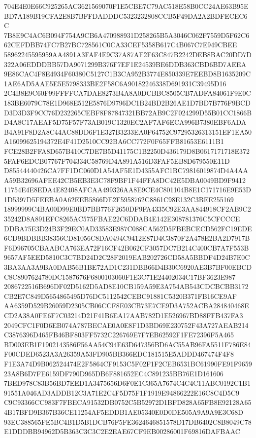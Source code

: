 \documentclass[UTF8,fontset=fandol,zihao=-4,a4paper]{ctexart}
\begin{document}
{{704E4E0E66C925265AC3621569070F1E5CBE7C79AC518E58B0CC24AE63B95EBD7A189B19CFA2E8B7BFFDADDDC5323232808CCB5F49DA2A2BDFECEC6C
7B8E9C4AC6B094F754A9CB6A470988931D258265B5A3046C062F7559D5F62C662CEFDBB74FC7B27BC728561C0CA33CEF5358B617C4B067C7E949CBEE
58962245595959AA4891A3FAF4E9C37A87AF2F63C847B2242DEB8BAC20DD7D322A06EDDDBB57DA9071299B376F7EF1E24539BE6DDB363CBD6BD7AEEA
9E86CAC4F8E4934F60380C5127C1B3CA952B3774E850339E7EEBD8B1635209C1AE6AD5AAE5E5E5798333BE2F58C6A90182246338D691931C39495D16
2C4B8E9C60F99FFFFCA7DAE8273B4A8A0DCBBC8505CB7ADFA84061F9E0C183BE6079C78E1D968E512E5876D9796DC1B24BD2B26AE1D7BD7B776F9BCD
D3D3D3F9CC76D232265CEBF8F87847321BB72AB9C2F024299D55B01CC1866BD4A8C17AEAF5D75F57F73AB019C1320EC2AF7AF6ECA996B7380EBF6ADA
B4A91F8D2A8C44AC88DD6F1E327B3233EA0F64752C97295326313151EF1EA50A16099625194372E4F41D2510CC92BA6CC772F0F65FFB81653E6111B1
FCE28B2FFA8D657B410C7DE7B5D41175C1B2250D436179D8B0617171718E3725FAF6EDCB07767F704334C58769D4A891A516D3FAF5EB8D679550E11D
D85544440426CA7FF1DC060D1A54AF5E1D4355AFC1BC79816019874D4A4AAA59B32696AFEE42CB5EB3E3C78F9BF1F44FFA8DC42E5DBA0049BD9F9412
11754E4E8EDA4E82408AFCAA499326AA8E9CE4C801104B8E1C171716E9E53D1D5397D5FEEBA0A62EEB5866DE2F5958762C8861C98E132C3BEE255169
18999999C4BA00D99E0BD7BB776F2650DF9FA4335C92E3AA844918CF2AB9C235242D8A891EFC8265AC575FBAE22C6DDAB4E142E308781376C5CFCCCE
DDBA75E3D24B3F29EC0AD33583E987C088CA562D5FBEBCECD562FC19EDE6CD9BDBBB38356CD81056C8DA0494C9412E87D4C3870F2A478E2BA2D7917B
F6D96705CBAABCA763EA72F16CF42B062CF3057DC7B214C400CB7A7F553B9657AF5EED5810C3C7BD24D2C28F2019EAB202726CD58A5BBDF4D24B7E0C
3BA3AA3A9BA0DAB56B1BE72AD1C231DBB66D4B30C6920AE3B7BF00EBCDC8C8907624780DC1587676F6800103060F1E3C71E24402034C17BF3623E987
2086722516B696DF02D5162D5AD8E10CB159A59E3A754AB543CDCBCBB3172CB2E7C849D5654865495D76DC5112542CEBC91881C5320B371FB16CE9AF
AA6359D529B26059D2305CB06CCF8E03CB73E7CE9D3A752ACBA284840468ECD2A38A0FE6F7C03214D21F41B6EA17AAB782D1E526967BD88FFB437FA3
2049CFC1F0D6EB074A787BECAE0A0E8F1D3BD69E230752F43A727AEAB214C3876396D465FB46BF803FF5732C226769E7F7EB62592F1FE72396F5A465
BD003EB1F1902143586F56AA54C94E63D647356BD6AC55AB96FA5511F786E84F00CDED6523A3A26359A53FD905BB366EDC181515E5ADDD467474F4F8
F1E3A74D9B062524474E2F5864CF9153C5F02F1F2CEB6531BC61990FE91F965923A8B6D7FE6159DF790D965DB6F881652EC4C891235BB76E1D161606
7BED978C83B56BD7EED1A3475656D6F0E1C365A7674C4C4C11ABC0192C1B191551A046AD3ADDB12C3A71E2C4F5D75F1F1919E94866222E16C8C4D5C9
C9C93366CC983F7FBECA91532DB0752C5B52972D1BFD828A65FB8E92128A654B17BFD9B367B36CE11254AF5EDDB1AE05340E0D0DE505A9A9A9E3C68D
93EC388565FE5BC4B1D5B1DCB76F5FE3624646851578D17DB6402C8B8049C78E1DDDBB94962D5B363C3C3C2E2EAE67CF9EB00286001F69816DAFBAAC
}}
\end{document}
